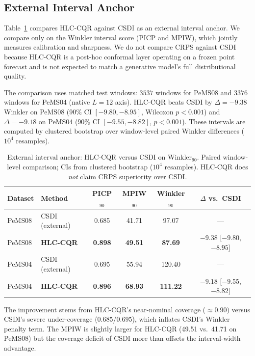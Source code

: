 \documentclass[letterpaper,journal]{IEEEtran}
\begin{document}
\subsection{External Interval Anchor}
\label{sec:external_anchor}

Table~\ref{tab:external_anchor} compares HLC-CQR against CSDI as an
external interval anchor.  We compare only on the Winkler interval score
(PICP and MPIW), which jointly measures calibration and sharpness.  We do
not compare CRPS against CSDI because HLC-CQR is a post-hoc conformal
layer operating on a frozen point forecast and is not expected to match a
generative model's full distributional quality.

The comparison uses matched test windows: $3537$ windows for PeMS08 and
$3376$ windows for PeMS04 (native $L=12$ axis).  HLC-CQR beats CSDI by
$\Delta{=}{-9.38}$ Winkler on PeMS08 (90\% CI $[-9.80,-8.95]$, Wilcoxon
$p<0.001$) and $\Delta{=}{-9.18}$ on PeMS04 (90\% CI $[-9.55,-8.82]$,
$p<0.001$).  These intervals are computed by clustered bootstrap over
window-level paired Winkler differences ($10^4$ resamples).

\begin{table}[t]
\centering
\caption{External interval anchor: HLC-CQR versus CSDI on Winkler$_{90}$.
Paired window-level comparison; CIs from clustered bootstrap ($10^4$
resamples).  HLC-CQR does \emph{not} claim CRPS superiority over CSDI.}
\label{tab:external_anchor}
\footnotesize
\begin{tabular}{llcccc}
\toprule
Dataset & Method & PICP$_{90}$ & MPIW$_{90}$ & Winkler$_{90}$ & $\Delta$ vs.\ CSDI \\
\midrule
PeMS08 & CSDI (external) & 0.685 & 41.71 & 97.07 & --- \\
PeMS08 & \textbf{HLC-CQR} & \textbf{0.898} & \textbf{49.51} & \textbf{87.69} & $-9.38$ [$-9.80$, $-8.95$] \\
\midrule
PeMS04 & CSDI (external) & 0.695 & 55.94 & 120.40 & --- \\
PeMS04 & \textbf{HLC-CQR} & \textbf{0.896} & \textbf{68.93} & \textbf{111.22} & $-9.18$ [$-9.55$, $-8.82$] \\
\bottomrule
\end{tabular}
\end{table}

The improvement stems from HLC-CQR's near-nominal coverage (${\approx}0.90$)
versus CSDI's severe under-coverage ($0.685$/$0.695$), which inflates CSDI's
Winkler penalty term.  The MPIW is slightly larger for HLC-CQR (49.51 vs.\
41.71 on PeMS08) but the coverage deficit of CSDI more than offsets the
interval-width advantage.
\end{document}
